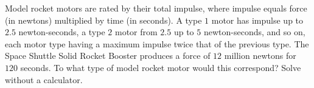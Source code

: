 Model rocket motors are rated by their total impulse, where impulse equals force (in newtons) multiplied by time (in seconds). A type $1$ motor has impulse up to $2.5$ newton-seconds, a type $2$ motor from $2.5$ up to $5$ newton-seconds, and so on, each motor type having a maximum impulse twice that of the previous type. The Space Shuttle Solid Rocket Booster produces a force of $12$ million newtons for $120$ seconds. To what type of model rocket motor would this correspond? Solve without a calculator.
